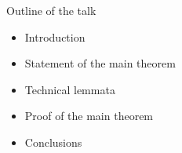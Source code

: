 \documentclass{beamer}
\begin{document}
 
 
\begin{frame}{Outline of the talk} 
 
\begin{itemize} 
  \item Introduction 
  \pause 
  \item Statement of the main theorem 
  \pause 
  \item Technical lemmata 
  \pause 
  \item Proof of the main theorem 
  \pause 
  \item Conclusions 
\end{itemize} 
 
\end{frame} 
 
\end{document}
